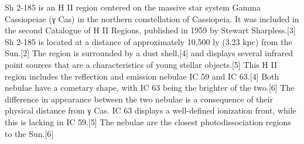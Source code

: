 Sh 2-185 is an H II region centered on the massive star system Gamma Cassiopeiae (γ Cas) in the northern constellation of Cassiopeia. It was included in the second Catalogue of H II Regions, published in 1959 by Stewart Sharpless.[3] Sh 2-185 is located at a distance of approximately 10,500 ly (3.23 kpc) from the Sun.[2] The region is surrounded by a dust shell,[4] and displays several infrared point sources that are a characteristics of young stellar objects.[5] This H II region includes the reflection and emission nebulae IC 59 and IC 63.[4] Both nebulae have a cometary shape, with IC 63 being the brighter of the two.[6] The difference in appearance between the two nebulae is a consequence of their physical distance from γ Cas. IC 63 displays a well-defined ionization front, while this is lacking in IC 59.[5] The nebulae are the closest photodissociation regions to the Sun.[6]
